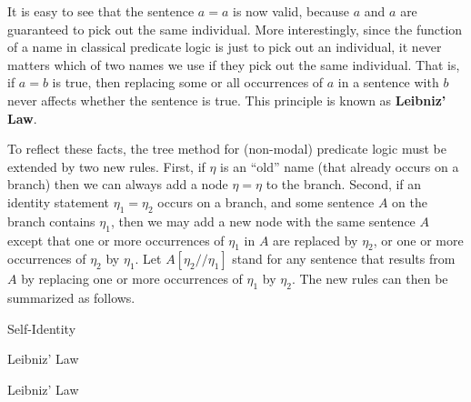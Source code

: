 It is easy to see that the sentence $a=a$ is now valid, because $a$ and $a$ are
guaranteed to pick out the same individual. More interestingly, since the
function of a name in classical predicate logic is just to pick out an
individual, it never matters which of two names we use if they pick out the same
individual. That is, if $a=b$ is true, then replacing some or all occurrences of
$a$ in a sentence with $b$ never affects whether the sentence is true. This
principle is known as \textbf{Leibniz' Law}.

To reflect these facts, the tree method for (non-modal) predicate logic must be
extended by two new rules. First, if $\eta$ is an ``old'' name (that already
occurs on a branch) then we can always add a node $\eta=\eta$ to the branch.
Second, if an identity statement $\eta_1=\eta_2$ occurs on a branch, and some
sentence $A$ on the branch contains $\eta_1$, then we may add a new node with
the same sentence $A$ except that one or more occurrences of $\eta_1$ in $A$ are
replaced by $\eta_2$, or one or more occurrences of $\eta_2$ by $\eta_1$. Let
$A[\eta_2/\!/\eta_1]$ stand for any sentence that results from $A$ by replacing
one or more occurrences of $\eta_1$ by $\eta_2$. The new rules can then be
summarized as follows.

\bigskip
\begin{center}
  \begin{minipage}[t]{0.3\textwidth} \centering

    Self-Identity
    
  \end{minipage}
  \begin{minipage}[t]{0.3\textwidth} \centering
    Leibniz' Law
    \bigskip

  \end{minipage}
  \begin{minipage}[t]{0.3\textwidth} \centering
    Leibniz' Law
    \bigskip

  \end{minipage}
  
\end{center}

